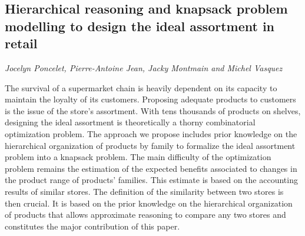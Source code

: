 \documentclass[../booklet.tex]{subfiles}
\begin{document}
\subsection[Hierarchical reasoning and knapsack problem modelling to design the ideal assortment in retail. {\it Jocelyn Poncelet, Pierre-Antoine Jean, Jacky Montmain and Michel Vasquez}]{Hierarchical reasoning and knapsack problem modelling to design the ideal assortment in retail}
   

\begin{center}
  {\it Jocelyn Poncelet, Pierre-Antoine Jean, Jacky Montmain and Michel Vasquez}
\end{center}

\vskip 0.8cm


The survival of a supermarket chain is heavily dependent on its capacity to maintain the loyalty of its customers. Proposing adequate products to customers is the issue of the store's assortment. With tens thousands of products on shelves, designing the ideal assortment is theoretically a thorny combinatorial optimization problem. The approach we propose includes prior knowledge on the hierarchical organization of products by family to formalize the ideal assortment problem into a knapsack problem. The main difficulty of the optimization problem remains the estimation of the expected benefits associated to changes in the product range of products' families. This estimate is based on the accounting results of similar stores. The definition of the similarity between two stores is then crucial. It is based on the prior knowledge on the hierarchical organization of products that allows approximate reasoning to compare any two stores and constitutes the major contribution of this paper.
\end{document}
